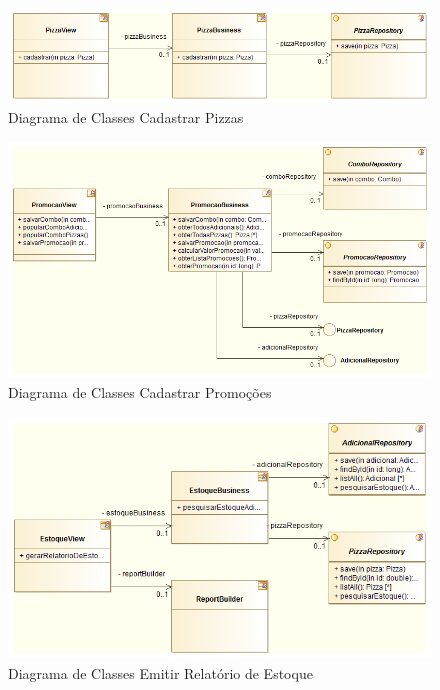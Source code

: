 \begin{figure}[h!]
 \centering
 \includegraphics[scale=0.5]{capitulo02/diagramaClassesCadastrarPizzas.png}
 \caption{Diagrama de Classes Cadastrar Pizzas}
\end{figure}

\begin{figure}[h!]
 \centering
 \includegraphics[scale=0.5]{capitulo02/diagramaClassesCadastrarPromocoes.png}
 \caption{Diagrama de Classes Cadastrar Promoções}
\end{figure}

\begin{figure}[h!]
 \centering
 \includegraphics[scale=0.5]{capitulo02/diagramaClassesEmitirRelatorioEstoque.png}
 \caption{Diagrama de Classes Emitir Relatório de Estoque}
\end{figure}

